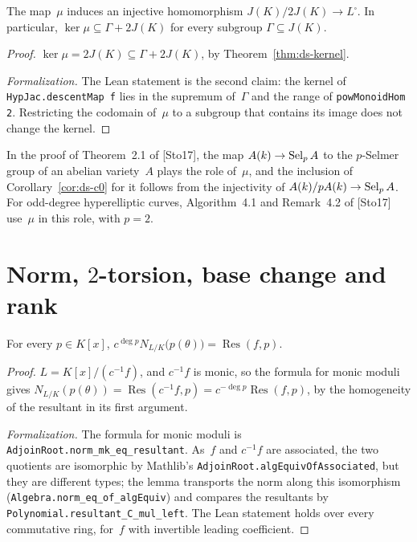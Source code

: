 \begin{corollary}
\label{cor:ds-c0}
\leanok
{}
The map~$\mu$ induces an injective homomorphism $J(K)/2J(K) \to L^\square$. In particular,
$\ker\mu \subseteq \Gamma + 2J(K)$ for every subgroup $\Gamma \subseteq J(K)$.
\end{corollary}

\begin{proof}
\leanok
{}
$\ker\mu = 2J(K) \subseteq \Gamma + 2J(K)$, by Theorem~\ref{thm:ds-kernel}.

\emph{Formalization.} The Lean statement is the second claim: the kernel of
\texttt{HypJac.descentMap f} lies in the supremum of~$\Gamma$ and the range of
\texttt{powMonoidHom 2}. Restricting the codomain of~$\mu$ to a subgroup that contains its image
does not change the kernel.
\end{proof}

In the proof of Theorem~2.1 of [Sto17], the map $A(k) \to \operatorname{Sel}_p A$ to the $p$-Selmer group of an
abelian variety~$A$ plays the role of~$\mu$, and the inclusion of Corollary~\ref{cor:ds-c0} for it
follows from the injectivity of $A(k)/pA(k) \to \operatorname{Sel}_p A$. For odd-degree hyperelliptic curves,
Algorithm~4.1 and Remark~4.2 of [Sto17] use~$\mu$ in this role, with $p = 2$.

\section{Norm, \texorpdfstring{$2$}{2}-torsion, base change and rank}
\label{sec:ds-basic}

\begin{lemma}
\label{lem:ds-resultant}
\leanok
For every $p \in K[x]$, $c^{\deg p}N_{L/K}\bigl(p(\theta)\bigr) = \operatorname{Res}(f, p)$.
\end{lemma}

\begin{proof}
\leanok
$L = K[x]/(c^{-1}f)$, and $c^{-1}f$ is monic, so the formula for monic moduli gives
$N_{L/K}(p(\theta)) = \operatorname{Res}(c^{-1}f, p) = c^{-\deg p}\operatorname{Res}(f, p)$, by
the homogeneity of the resultant in its first argument.

\emph{Formalization.} The formula for monic moduli is \texttt{AdjoinRoot.norm\_mk\_eq\_resultant}.
As~$f$ and $c^{-1}f$ are associated, the two quotients are isomorphic by Mathlib's
\texttt{AdjoinRoot.algEquivOfAssociated}, but they are different types; the lemma transports the
norm along this isomorphism (\texttt{Algebra.norm\_eq\_of\_algEquiv}) and compares the resultants
by \texttt{Polynomial.resultant\_C\_mul\_left}. The Lean statement holds over every commutative
ring, for~$f$ with invertible leading coefficient.
\end{proof}

